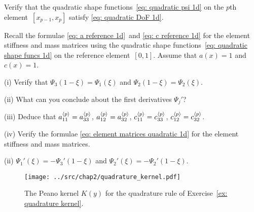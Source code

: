 \begin{Exercises}
\exercise\label{ex: quadratic DoF 1d}
Verify that the quadratic shape functions~\eqref{eq: quadratic psi 1d} on the 
$p$th element~$[x_{p-1},x_p]$ satisfy \eqref{eq: quadratic DoF 1d}.

\exercise
Recall the formulae \eqref{eq: a reference 1d}~and
\eqref{eq: c reference 1d} for the element stiffness and mass matrices using 
the quadratic shape functions~\eqref{eq: quadratic shape funcs 1d} on the 
reference element~$[0,1]$.  Assume that $a(x)=1$ and $c(x)=1$.
\begin{description}
\item{(i)} Verify that $\Psi_3(1-\xi)=\Psi_1(\xi)$ and 
$\Psi_2(1-\xi)=\Psi_2(\xi)$.
\item{(ii)} What can you conclude about the first derivatives $\Psi_j'$?
\item{(iii)} Deduce that
$a^{\langle p\rangle}_{11}=a^{\langle p\rangle}_{33}$, $a^{\langle p\rangle}_{12}=a^{\langle p\rangle}_{32}$,
$c^{\langle p\rangle}_{11}=c^{\langle p\rangle}_{33}$, $c^{\langle p\rangle}_{12}=c^{\langle p\rangle}_{32}$.
\item{(iv)} Verify the formulae \eqref{eq: element matrices quadratic 1d}
for the element stiffness and mass matrices.
\end{description}
\begin{ans}
(ii) $\Psi_1'(\xi)=-\Psi_3'(1-\xi)$ and $\Psi_2'(\xi)=-\Psi_2'(1-\xi)$.
\end{ans}


\begin{figure}
\caption{The Peano kernel $K(y)$ for the quadrature rule of 
Exercise~\ref{ex: quadrature kernel}.}\label{fig: quadrature kernel}
\begin{center}
\texttt{[image: ../src/chap2/quadrature\_kernel.pdf]}
\end{center}
\end{figure}


\end{Exercises}
